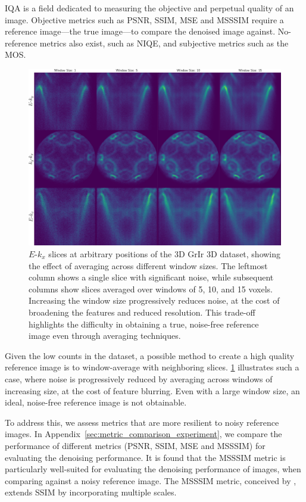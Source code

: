 \gls{IQA} is a field dedicated to measuring the objective and perpetual quality of an image. Objective metrics such as \gls{PSNR}, \gls{SSIM}, \gls{MSE} and \gls{MSSSIM} require a reference image---the true image---to compare the denoised image against. No-reference metrics also exist, such as \gls{NIQE}, and subjective metrics such as the \gls{MOS}.

\begin{figure}[h]
    \centering
    \includegraphics[width=1\linewidth]{images/slices.pdf}
    \caption{$E$-$k_x$ slices at arbitrary positions of the 3D \gls{GrIr} 3D dataset, showing the effect of averaging across different window sizes. The leftmost column shows a single slice with significant noise, while subsequent columns show slices averaged over windows of 5, 10, and 15 voxels. Increasing the window size progressively reduces noise, at the cost of broadening the features and reduced resolution. This trade-off highlights the difficulty in obtaining a true, noise-free reference image even through averaging techniques.}
    \label{fig:slices}
\end{figure}

Given the low counts in the dataset, a possible method to create a high quality reference image is to window-average with neighboring slices. \cref{fig:slices} illustrates such a case, where noise is progressively reduced by averaging across windows of increasing size, at the cost of feature blurring. Even with a large window size, an ideal, noise-free reference image is not obtainable.

To address this, we assess metrics that are more resilient to noisy reference images. In Appendix~\ref{sec:metric_comparison_experiment}, we compare the performance of different metrics (\gls{PSNR}, \gls{SSIM}, \gls{MSE} and \gls{MSSSIM}) for evaluating the denoising performance. It is found that the \gls{MSSSIM} metric is particularly well-suited for evaluating the denoising performance of images, when comparing against a noisy reference image. The \gls{MSSSIM} metric, conceived by \citeauthor{wangMultiscaleStructuralSimilarity2003} \cite{wangMultiscaleStructuralSimilarity2003}, extends SSIM by incorporating multiple scales. 

